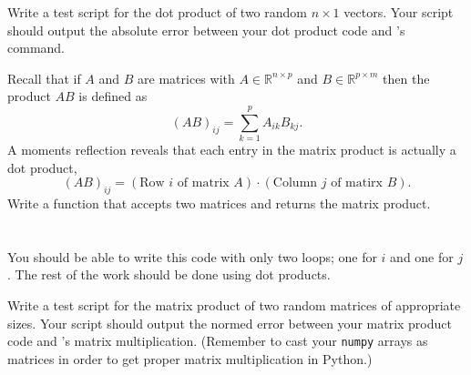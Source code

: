 \begin{problem}
    Write a test script for the dot product of two random $n \times 1$ vectors.  Your
    script should output the absolute error between your dot product code and \ProgLang's
    \ifnum{}
    \else
    \fi
    command.
\end{problem}

\begin{problem}\label{prob:matrix_mult}
    Recall that if $A$ and $B$ are matrices with $A \in \mathbb{R}^{n \times p}$ and $B \in \mathbb{R}^{p \times m}$
    then the product $AB$ is defined as
    \[ \left( AB \right)_{ij} = \sum_{k=1}^p A_{ik} B_{kj}. \]
    A moments reflection reveals that each entry in the matrix product is actually a dot
    product, 
    \[ \left( AB \right)_{ij} = \left( \text{Row $i$ of matrix $A$} \right) \cdot \left(
    \text{Column $j$ of matirx $B$} \right). \]
    Write a \ProgLang function that accepts two matrices and returns the matrix product. \\
    \ifnum{}
     \\
    \else
     \\
    \fi
    You
    should be able to write this code with only two loops; one for $i$ and one for $j$.
    The rest of the work should be done using dot products.
\end{problem}
\begin{problem}
    Write a test script for the matrix product of two random matrices of appropriate
    sizes.  Your script should output the normed error between your matrix product code
    and \ProgLang's matrix multiplication. \ifnum{} (Remember to cast your
    \texttt{numpy} arrays as matrices in order to get proper matrix multiplication in
    Python.)\fi
\end{problem}

